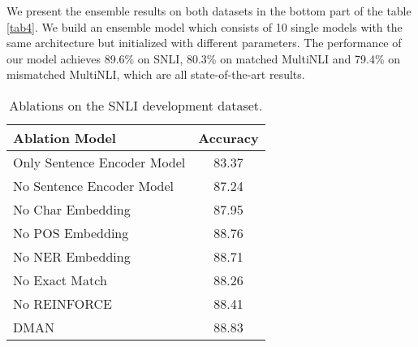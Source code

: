 \documentclass[11pt,letterpaper]{article}
\begin{document}
We present the ensemble results on both datasets in the bottom part of the table \ref{tab4}. We build an ensemble model which consists of 10 single models with the same architecture but initialized with different parameters. The performance of our model achieves 89.6\% on SNLI, 80.3\% on matched MultiNLI and 79.4\% on mismatched MultiNLI, which are all state-of-the-art results.




\begin{table}
	\begin{tabular}{p{5.3cm}c}
		\toprule
		\textbf{Ablation Model}	&  \textbf{Accuracy} \\
		\midrule
		Only Sentence Encoder Model & 83.37 \\
		No Sentence Encoder Model & 87.24 \\ 
		No Char Embedding & 87.95 \\ 
		No POS Embedding & 88.76 \\ 
		No NER Embedding & 88.71 \\ 
		No Exact Match & 88.26 \\
		No REINFORCE & 88.41 \\ \hline
		DMAN     & 88.83     \\
		\bottomrule
	\end{tabular}
	\vspace{2mm}
	\caption{Ablations on the SNLI development dataset.}       
	\label{tab5}
\end{table}
\end{document}
